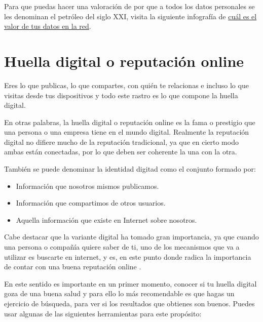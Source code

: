 \documentclass[
  spanish,
  a4paper,
  openany]{book}
\begin{document}
Para que puedas hacer una valoración de por que a todos los datos personales se les denominan el petróleo del siglo XXI, visita la siguiente infografía de \href{https://www.osi.es/sites/default/files/images/concienciacion/c15-pdf-infografia-ciberdelincuentes_reyes.pdf}{cuál es el valor de tus datos en la red}.

\hypertarget{huella-digital-o-reputaciuxf3n-online}{%
\section{Huella digital o reputación online}\label{huella-digital-o-reputaciuxf3n-online}}

Eres lo que publicas, lo que compartes, con quién te relacionas e incluso lo que visitas desde tus dispositivos y todo este rastro es lo que compone la huella digital.

En otras palabras, la huella digital o reputación online es la fama o prestigio que una persona o una empresa tiene en el mundo digital. Realmente la reputación digital no difiere mucho de la reputación tradicional, ya que en cierto modo ambas están conectadas, por lo que deben ser coherente la una con la otra.

También se puede denominar la identidad digitad como el conjunto formado por:

\begin{itemize}
\item
  Información que nosotros mismos publicamos.
\item
  Información que compartimos de otros usuarios.
\item
  Aquella información que existe en Internet sobre nosotros.
\end{itemize}

Cabe destacar que la variante digital ha tomado gran importancia, ya que cuando una persona o compañía quiere saber de ti, uno de los mecanismos que va a utilizar es buscarte en internet, y es, en este punto donde radica la importancia de contar con una buena reputación online \citep{huella-digital}.

En este sentido es importante en un primer momento, conocer si tu huella digital goza de una buena salud y para ello lo más recomendable es que hagas un ejercicio de búsqueda, para ver si los resultados que obtienes son buenos. Puedes usar algunas de las siguientes herramientas para este propósito:
\end{document}
